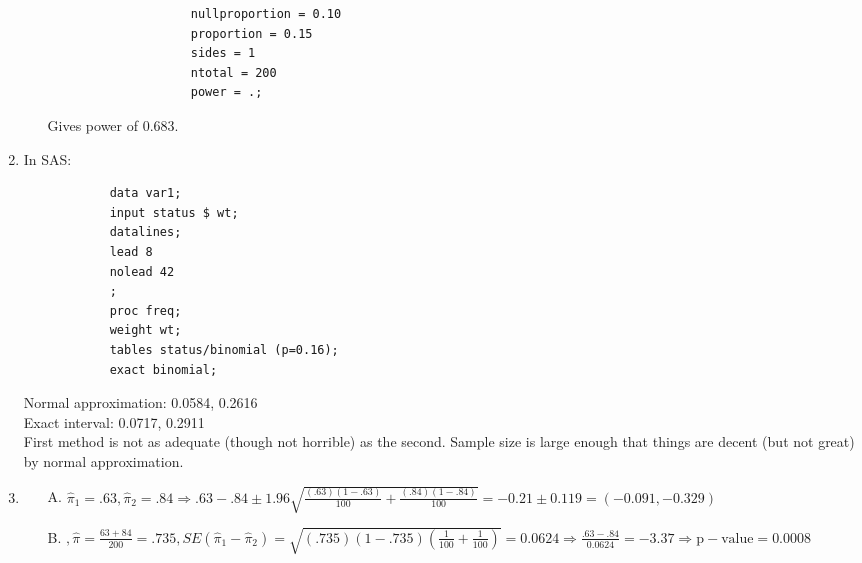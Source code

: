 \documentclass{article}
\begin{document}
\begin{enumerate}
\begin{itemize}
\begin{verbatim}
					nullproportion = 0.10
					proportion = 0.15
					sides = 1
					ntotal = 200
					power = .;
				\end{verbatim}
				Gives power of 0.683.
		\end{itemize}
	\item In SAS:
		\begin{verbatim}
			data var1;
			input status $ wt;
			datalines;
			lead 8
			nolead 42
			;
			proc freq;
			weight wt;
			tables status/binomial (p=0.16);
			exact binomial;
		\end{verbatim}
		Normal approximation: 0.0584, 0.2616 \\
		Exact interval: 0.0717, 0.2911 \\
		First method is not as adequate (though not horrible) as the second. Sample size is large enough that things are decent (but not great) by normal approximation.
	\item
		\begin{itemize}
			\item[A.] $\hat{\pi}_1 = .63, \hat{\pi}_2 = .84 \Rightarrow .63 - .84 \pm 1.96 \sqrt{\frac{(.63)(1-.63)}{100} + \frac{(.84)(1-.84)}{100}} = -0.21 \pm 0.119 = (-0.091, -0.329)$
			\item[B.] $, \hat{\pi} = \frac{63 + 84}{200} = .735, SE(\hat{\pi}_1 - \hat{\pi}_2) = \sqrt{(.735)(1-.735)(\frac{1}{100} + \frac{1}{100})} = 0.0624 \Rightarrow \frac{.63 - .84}{0.0624} = -3.37 \Rightarrow \mathrm{p-value} = 0.0008$
		\end{itemize}
\end{enumerate}
\end{document}
